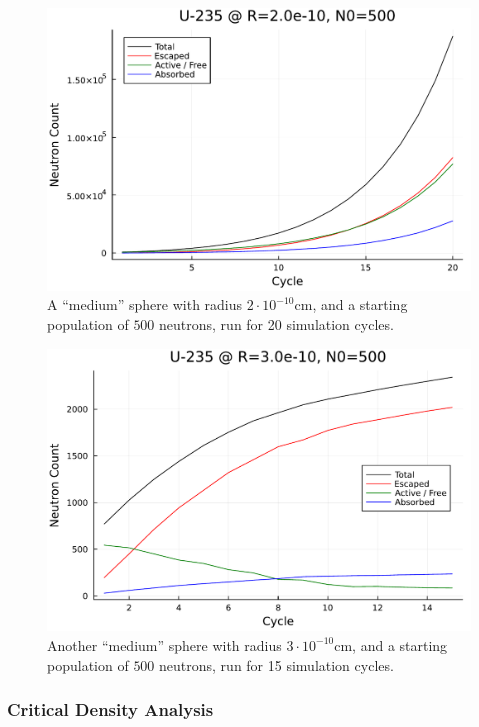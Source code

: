 \begin{figure}[h!]
    \centering
    \includegraphics[scale=0.55]{imgs/neutron-count-uranium-medium-sphere-3-long.pdf}
    \caption{A ``medium'' sphere with radius $2 \cdot 10^{-10}$cm, and a starting population of $500$ neutrons, run for 20 simulation 
    cycles.}
\end{figure}\newpage

\begin{figure}[h!]
    \centering
    \includegraphics[scale=0.55]{imgs/neutron-count-uranium-medium-sphere-2.pdf}
    \caption{Another ``medium'' sphere with radius $3 \cdot 10^{-10}$cm, and a starting population of $500$ neutrons, run for 15 simulation 
    cycles.}
\end{figure}\newpage

\subsubsection{Critical Density Analysis}

